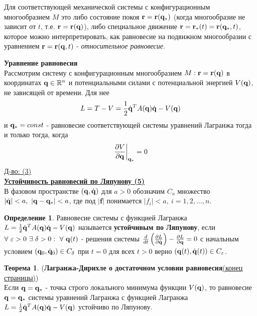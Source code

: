 \documentclass[specialist, subf, href, colorlinks=true, 12pt, times, mtpro, final]{disser}
\theoremstyle{definition}
\newtheorem{defn}{Определение}[section]
\newtheorem{theorem}{Теорема}[section]
\begin{document}
    	Для соответствующей механической системы с конфигурационным многообразием $M$ это либо состояние покоя $\mathbf{r} = \mathbf{r}(\mathbf{q}_*)$ (когда многообразие не зависит от $t$, т.е. $\mathbf{r}=\mathbf{r}(\mathbf{q})$), либо специальное движение $\mathbf{r} = \mathbf{r}_*(t) = \mathbf{r}(\mathbf{q}_*,t)$, которое можно интерпретировать, как равновесие на подвижном многообразии с уравнением $\mathbf{r}=\mathbf{r}(\mathbf{q},t)$ - \textit{относительное равновесие}.
    	
    	\textbf{Уравнение равновесия} \\
    	Рассмотрим систему с конфигурационным многообразием $M:\mathbf{r} = \mathbf{r}(\mathbf{q})$ в координатах $\mathbf{q} \in \mathbb{R}^n$ и потенциальными силами с потенциальной энергией $V(\mathbf{q})$, не зависящей от времени. Для нее 
    	$$
    		L = T - V = \frac{1}{2}\dot{\mathbf{q}}^T A(\mathbf{q}) \dot{\mathbf{q}} - V(\mathbf{q})
    	$$
    	и $\mathbf{q}_* = const$ - равновесие соответствующей системы уравнений Лагранжа тогда и только тогда, когда
    	$$
    		\left. \frac{\partial V}{\partial \mathbf{q}} \right|_{\mathbf{q}_*} = 0
    	$$
    	\hyperlink {lects.10}{Д-во: (3)} \\
    	
    	\textbf{\hyperlink {lects.10}{Устойчивость равновесий по Ляпунову (5)}} \\
    	В фазовом пространстве $(\mathbf{q},\dot{\mathbf{q}})$ для $a>0$ обозначим $C_a$ множество $|\dot{\mathbf{q}}| <a, \ |\mathbf{q}-\mathbf{q}_*| < a$, где под $|\textbf{f}|$ понимается $|f_i| < a, \ i = 1,2,...,n$.
    	\begin{defn}
    		Равновесие системы с функцией Лагранжа $L = \frac{1}{2}\dot{\mathbf{q}}^T A(\mathbf{q}) \dot{\mathbf{q}} - V(\mathbf{q})$ называется \textbf{устойчивым по Ляпунову}, если $\forall \ \varepsilon > 0 \ \exists \ \delta > 0 : \ \forall \ \mathbf{q}(t)$ - решения системы $\frac{d}{dt}\left( \frac{\partial L}{\partial \dot{\mathbf{q}}} \right) - \frac{\partial L}{\partial\mathbf{q}} = 0$ с начальным условием $(\mathbf{q}_0, \dot{\mathbf{q}}_0)\in C_{\delta}$ при $t = 0$ для всех $t > 0$ верно $(\mathbf{q}(t), \dot{\mathbf{q}}(t)) \in C_{\varepsilon}$.
    	\end{defn}  
    
    	\begin{theorem}
    		(\textbf{Лагранжа-Дирихле о достаточном условии равновесия}\hyperlink {lects.10}{(конец страницы)}) \\
    		Если $\mathbf{q} = \mathbf{q}_*$ - точка строго локального минимума функции $V(\mathbf{q})$, то равновесие $\mathbf{q} = \mathbf{q}_*$ системы уравнений Лагранжа с функцией Лагранжа $L = \frac{1}{2}\dot{\mathbf{q}}^T A(\mathbf{q}) \dot{\mathbf{q}} - V(\mathbf{q})$ устойчиво по Ляпунову.
    	\end{theorem}
\end{document}
